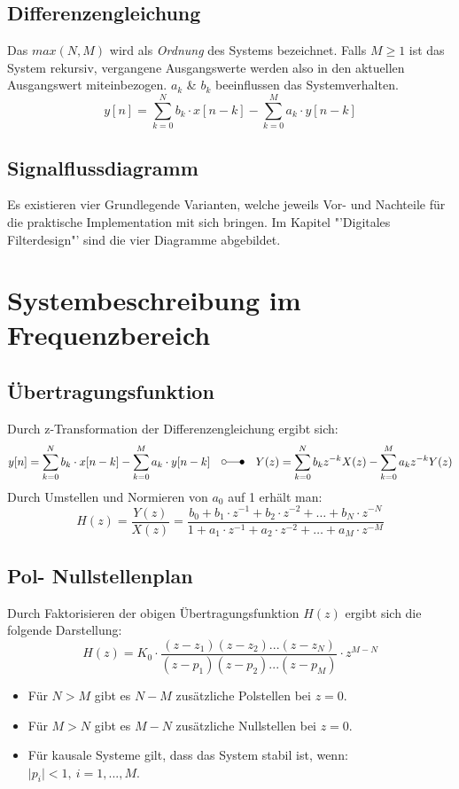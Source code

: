 \subsection{Differenzengleichung}
Das $max(N,M)$ wird als \emph{Ordnung} des Systems bezeichnet. Falls $M \geq 1$ ist das System rekursiv, 
vergangene Ausgangswerte werden also in den aktuellen Ausgangswert miteinbezogen. $a_k$ \& 
$b_k$ beeinflussen das Systemverhalten.
\[y[n] = \sum_{k=0}^{N}b_k \cdot x[n-k]-\sum_{k=0}^{M} a_k \cdot y[n-k]\]
\subsection{Signalflussdiagramm}
Es existieren vier Grundlegende Varianten, welche jeweils Vor- und Nachteile für die 
praktische Implementation mit sich bringen. Im Kapitel "'Digitales Filterdesign"' sind
die vier Diagramme abgebildet. 

\section{Systembeschreibung im Frequenzbereich}
\subsection{Übertragungsfunktion}
Durch z-Transformation der Differenzengleichung ergibt sich:
\[y[n] = \sum_{k=0}^{N}b_k \cdot x[n-k]-\sum_{k=0}^{M} a_k \cdot y[n-k] \quad \laplace 
\quad Y(z) = \sum_{k=0}^{N}b_k z^{-k} X(z)-\sum_{k=0}^{M} a_k z^{-k} Y(z) \]
Durch Umstellen und Normieren von $a_0$ auf 1 erhält man: 
\[ H(z) = \frac{Y(z)}{X(z)} =
\frac{b_0+b_1 \cdot z^{-1} + b_2 \cdot z^{-2}+\ldots+b_N \cdot z^{-N}}
	{1+a_1 \cdot z^{-1} + a_2 \cdot z^{-2}+\ldots+a_M \cdot z^{-M}} \]
\subsection{Pol- Nullstellenplan}
Durch Faktorisieren der obigen Übertragungsfunktion $H(z)$ ergibt sich die folgende Darstellung:
\[  H(z) =  K_0 \cdot \frac{(z-z_1)(z-z_2)...(z-z_N)}
								{(z-p_1)(z-p_2)...(z-p_M)}
								\cdot z^{M-N} \]
\begin{itemize}[noitemsep,topsep=3pt]
	\item Für $N>M$ gibt es $N-M$ zusätzliche Polstellen bei $z=0$.
	\item Für $M>N$ gibt es $M-N$ zusätzliche Nullstellen bei $z=0$.
	\item Für kausale Systeme gilt, dass das System stabil ist, wenn: $\big| p_i \big| < 1,\  i =1,...,M$.
\end{itemize}					

